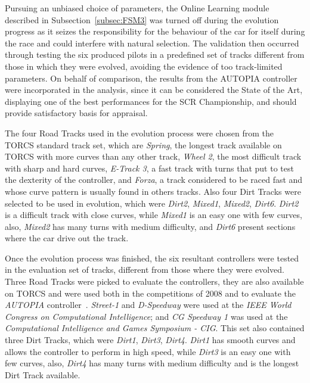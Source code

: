 	Pursuing an unbiased choice of parameters, the Online Learning module described in Subsection~\ref{subsec:FSM3} was turned off during the evolution progress as it seizes the responsibility for the behaviour of the car for itself during the race and could interfere with natural selection. The validation then occurred through testing the six produced pilots in a predefined set of tracks different from those in which they were evolved, avoiding the evidence of too track-limited parameters. On behalf of comparison, the results from the AUTOPIA controller were incorporated in the analysis, since it can be considered the State of the Art, displaying one of the best performances for the SCR Championship, and should provide satisfactory basis for appraisal.

	The four Road Tracks used in the evolution process were chosen from the TORCS standard track set, which are \emph{Spring}, the longest track available on TORCS with more curves than any other track, \emph{Wheel 2}, the most difficult track with sharp and hard curves, \emph{E-Track 3}, a fast track with turns that put to test the dexterity of the controller, and \emph{Forza}, a track considered to be raced fast and whose curve pattern is usually found in others tracks. Also four Dirt Tracks were selected to be used in evolution, which were \emph{Dirt2}, \emph{Mixed1}, \emph{Mixed2}, \emph{Dirt6}. \emph{Dirt2} is a difficult track with close curves, while \emph{Mixed1} is an easy one with few curves, also, \emph{Mixed2} has many turns with medium difficulty, and \emph{Dirt6} present sections where the car drive out the track.
	
	Once the evolution process was finished, the six resultant controllers were tested in the evaluation set of tracks, different from those where they were evolved. Three Road Tracks were picked to evaluate the controllers, they are also available on TORCS and were used both in the competitions of 2008 and to evaluate the \emph{AUTOPIA} controller~\cite{AUTOPIA2009}. \emph{Street-1} and \emph{D-Speedway} were used at the \emph{IEEE World Congress on Computational Intelligence}; and \emph{CG Speedway 1} was used at the \emph{Computational Intelligence and Games Symposium - CIG}. This set also contained three Dirt Tracks, which were \emph{Dirt1}, \emph{Dirt3}, \emph{Dirt4}. \emph{Dirt1} has smooth curves and allows the controller to perform in high speed, while \emph{Dirt3} is an easy one with few curves, also, \emph{Dirt4} has many turns with medium difficulty and is the longest Dirt Track available.
	  
